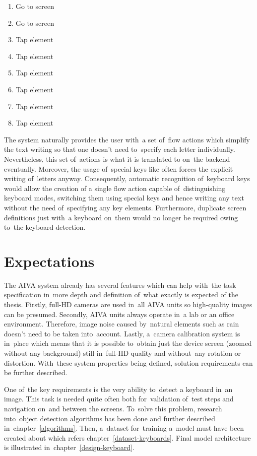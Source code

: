 \begin{enumerate}[topsep=0pt,itemsep=-1.5pt,partopsep=6pt]
  \item Go to screen 
  \item Go to screen 
  \item Tap element 
  \item Tap element 
  \item Tap element 
  \item Tap element 
  \item Tap element 
  \item Tap element 
\end{enumerate}

The system naturally provides the user with~a set of~flow actions which simplify the text writing so that one doesn't need to~specify each letter individually. Nevertheless, this set of~actions is what it is translated to on~the backend eventually. Moreover, the usage of~special keys like  often forces the explicit writing of~letters anyway. Consequently, automatic recognition of~keyboard keys would allow the creation of a single flow action capable of~distinguishing keyboard modes, switching them using special keys and hence writing any text without the need of~specifying any key elements. Furthermore, duplicate screen definitions just with~a keyboard on~them would no longer be required owing to~the keyboard detection.

\section{Expectations}
\label{introduction-expectation}
The AIVA system already has several features which can help with~the task specification in~more depth and definition of~what exactly is expected of the thesis. Firstly, full-HD cameras are used in~all AIVA units so high-quality images can be presumed. Secondly, AIVA units always operate in~a lab or an office environment. Therefore, image noise caused by~natural elements such as rain doesn't need to be taken into~account. Lastly, a~camera calibration system is in~place which means that it is possible to~obtain just the device screen (zoomed without any background) still in~full-HD quality and without~any rotation or distortion. With~these system properties being defined, solution requirements can be further described.

One of~the key requirements is the very ability to~detect a keyboard in~an image. This task is needed quite often both for~validation of~test steps and navigation on~and between the screens. To~solve this problem, research into~object detection algorithms has been done and further described in~chapter~\ref{algorithms}. Then, a~dataset for~training a~model must have been created about which refers chapter~\ref{dataset-keyboards}. Final model architecture is illustrated in~chapter~\ref{design-keyboard}.

